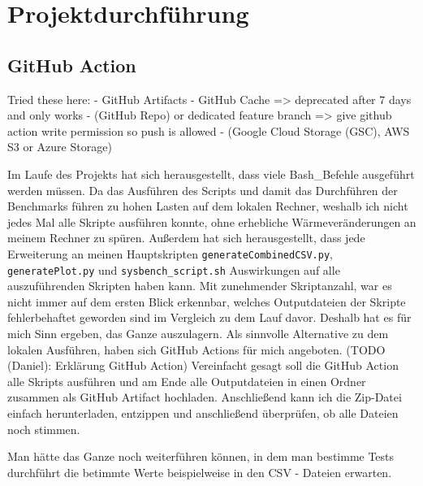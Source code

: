 \chapter{Projektdurchführung}\label{ch:projektdurchfuhrung}

\section{GitHub Action}\label{sec:github-action}

Tried these here:
- GitHub Artifacts
- GitHub Cache => deprecated after 7 days and only works
- (GitHub Repo) or dedicated feature branch => give github action write permission so push is allowed
- (Google Cloud Storage (GSC), AWS S3 or Azure Storage)


Im Laufe des Projekts hat sich herausgestellt, dass viele Bash\_Befehle ausgeführt werden müssen.
Da das Ausführen des Scripts und damit das Durchführen der Benchmarks führen zu hohen Lasten auf dem lokalen Rechner, weshalb ich nicht jedes Mal alle Skripte ausführen konnte, ohne erhebliche Wärmeveränderungen an meinem Rechner zu spüren.
Außerdem hat sich herausgestellt, dass jede Erweiterung an meinen Hauptskripten \texttt{generateCombinedCSV.py}, \texttt{generatePlot.py} und \texttt{sysbench\_script.sh} Auswirkungen auf alle auszuführenden Skripten haben kann.
Mit zunehmender Skriptanzahl, war es nicht immer auf dem ersten Blick erkennbar, welches Outputdateien der Skripte fehlerbehaftet geworden sind im Vergleich zu dem Lauf davor.
Deshalb hat es für mich Sinn ergeben, das Ganze auszulagern.
Als sinnvolle Alternative zu dem lokalen Ausführen, haben sich GitHub Actions für mich angeboten.
(TODO (Daniel): Erklärung GitHub Action)
Vereinfacht gesagt soll die GitHub Action alle Skripts ausführen und am Ende alle Outputdateien in einen Ordner zusammen als GitHub Artifact hochladen.
Anschließend kann ich die Zip-Datei einfach herunterladen, entzippen und anschließend überprüfen, ob alle Dateien noch stimmen.

Man hätte das Ganze noch weiterführen können, in dem man bestimme Tests durchführt die betimmte Werte beispielweise in den CSV - Dateien erwarten.


